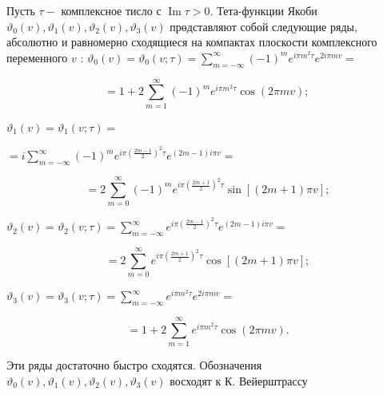 \documentclass[10pt]{article}
\begin{document}
Пусть $\tau-$ комплексное тисло с $\operatorname{Im} \tau>0$. Тета-функции Якоби $\vartheta_{0}(v), \vartheta_{1}(v), \vartheta_{2}(v), \vartheta_{3}(v)$ прөдставляют собой следующие ряды, абсолютно и равномерно сходящиеся на компактах плоскости комплексного переменного $v$ : $\vartheta_{0}(v)=\vartheta_{0}(v ; \tau)=\sum_{m=-\infty}^{\infty}(-1)^{m} e^{i \pi m^{2} \tau} e^{2 i \pi m v}=$



\[

=1+2 \sum_{m=1}^{\infty}(-1)^{m} e^{i \pi m^{2} \tau} \cos (2 \pi m v) \text {; }

\]



$\vartheta_{1}(v)=\vartheta_{1}(v ; \tau)=$



$=i \sum_{m=-\infty}^{\infty}(-1)^{m} e^{i \pi\left(\frac{2 m-1}{2}\right)^{2} \tau} e^{(2 m-1) i \pi v}=$



\[

=2 \sum_{m=0}^{\infty}(-1)^{m} e^{i \pi\left(\frac{2 m+1}{2}\right)^{2} \tau} \sin [(2 m+1) \pi v] ;

\]



$\vartheta_{2}(v)=\vartheta_{2}(v ; \tau)=\sum_{m=-\infty}^{\infty} e^{i \pi\left(\frac{2 m-1}{2}\right)^{2} \tau} e^{(2 m-1) i \pi v}=$



\[

=2 \sum_{m=0}^{\infty} e^{i \pi\left(\frac{2 m+1}{2}\right)^{2} \tau} \cos [(2 m+1) \pi v] ;

\]



$\vartheta_{3}(v)=\vartheta_{3}(v ; \tau)=\sum_{m=-\infty}^{\infty} e^{i \pi m^{2} \tau} e^{2 i \pi m v}=$



\[

=1+2 \sum_{m=1}^{\infty} e^{i \pi m^{2} \tau} \cos (2 \pi m v) .

\]



Эти ряды достаточно быстро сходятся. Обозначения $\vartheta_{0}(v), \vartheta_{1}(v), \vartheta_{2}(v), \vartheta_{3}(v)$ восходят к К. Вейерштрассу
\end{document}
